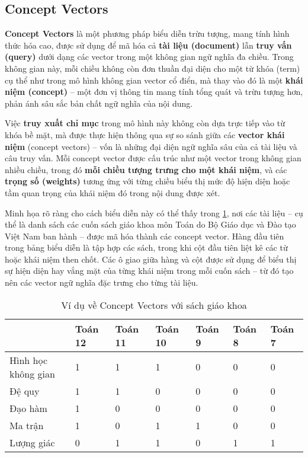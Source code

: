 \subsection{Concept Vectors}
\textbf{Concept Vectors} là một phương pháp biểu diễn trừu tượng, mang tính hình thức hóa cao, được sử dụng để mã hóa cả \textbf{tài liệu (document)} lẫn \textbf{truy vấn (query)} dưới dạng các vector trong một không gian ngữ nghĩa đa chiều. Trong không gian này, mỗi chiều không còn đơn thuần đại diện cho một từ khóa (term) cụ thể như trong mô hình không gian vector cổ điển, mà thay vào đó là một \textbf{khái niệm (concept)} -- một đơn vị thông tin mang tính tổng quát và trừu tượng hơn, phản ánh sâu sắc bản chất ngữ nghĩa của nội dung. \cite{Abdulahhad_2018}

Việc \textbf{truy xuất chỉ mục} trong mô hình này không còn dựa trực tiếp vào từ khóa bề mặt, mà được thực hiện thông qua sự so sánh giữa các \textbf{vector khái niệm} (concept vectors) -- vốn là những đại diện ngữ nghĩa sâu của cả tài liệu và câu truy vấn. Mỗi concept vector được cấu trúc như một vector trong không gian nhiều chiều, trong đó \textbf{mỗi chiều tượng trưng cho một khái niệm}, và các \textbf{trọng số (weights)} tương ứng với từng chiều biểu thị mức độ hiện diện hoặc tầm quan trọng của khái niệm đó trong nội dung được xét.

Minh họa rõ ràng cho cách biểu diễn này có thể thấy trong \ref{table:vector_space_model:truy_xuat_chi_muc:concept_vectors_sach_giao_khoa}, nơi các tài liệu -- cụ thể là danh sách các cuốn sách giáo khoa môn Toán do Bộ Giáo dục và Đào tạo Việt Nam ban hành -- được mã hóa thành các concept vector. Hàng đầu tiên trong bảng biểu diễn là tập hợp các sách, trong khi cột đầu tiên liệt kê các từ hoặc khái niệm then chốt. Các ô giao giữa hàng và cột được sử dụng để biểu thị sự hiện diện hay vắng mặt của từng khái niệm trong mỗi cuốn sách -- từ đó tạo nên các vector ngữ nghĩa đặc trưng cho từng tài liệu.

\begin{table}[H]
    \caption{Ví dụ về Concept Vectors với sách giáo khoa}
    \label{table:vector_space_model:truy_xuat_chi_muc:concept_vectors_sach_giao_khoa}
    \begin{tabularx}{\linewidth}{X || l l l l l l}
        \toprule
                            & Toán 12 & Toán 11 & Toán 10 & Toán 9 & Toán 8 & Toán 7 \\
        \midrule\midrule
        Hình học không gian & 1       & 1       & 1       & 0      & 0      & 0      \\
        Đệ quy              & 1       & 1       & 0       & 0      & 0      & 0      \\
        Đạo hàm             & 1       & 0       & 0       & 0      & 0      & 0      \\
        Ma trận             & 1       & 0       & 1       & 1      & 0      & 0      \\
        Lượng giác          & 0       & 1       & 1       & 0      & 1      & 1      \\
        \bottomrule
    \end{tabularx}
\end{table}

